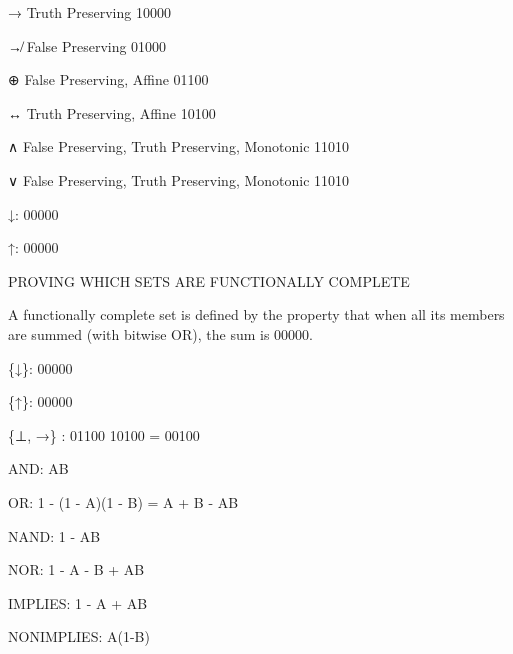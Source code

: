 → Truth Preserving 10000

↛ False Preserving 01000

⊕ False Preserving, Affine 01100

↔ Truth Preserving, Affine 10100

∧ False Preserving, Truth Preserving, Monotonic 11010

∨ False Preserving, Truth Preserving, Monotonic 11010

↓: 00000

↑: 00000

PROVING WHICH SETS ARE FUNCTIONALLY COMPLETE

A functionally complete set is defined by the property that when all its
members are summed (with bitwise OR), the sum is 00000.

\{↓\}: 00000

\{↑\}: 00000

\{⊥, →\} : 01100 \textbar\textbar{} 10100 = 00100

AND: AB

OR: 1 - (1 - A)(1 - B) = A + B - AB

NAND: 1 - AB

NOR: 1 - A - B + AB

IMPLIES: 1 - A + AB

NONIMPLIES: A(1-B)